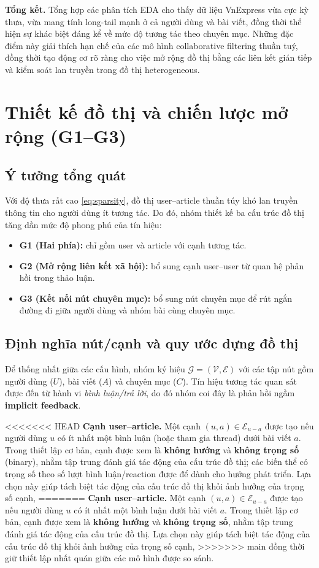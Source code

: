 \documentclass[11pt]{article}
\begin{document}
\textbf{Tổng kết.}
Tổng hợp các phân tích EDA cho thấy dữ liệu VnExpress vừa cực kỳ thưa,
vừa mang tính long-tail mạnh ở cả người dùng và bài viết,
đồng thời thể hiện sự khác biệt đáng kể về mức độ tương tác theo chuyên mục.
Những đặc điểm này giải thích hạn chế của các mô hình collaborative filtering thuần tuý,
đồng thời tạo động cơ rõ ràng cho việc mở rộng đồ thị bằng các liên kết gián tiếp
và kiểm soát lan truyền trong đồ thị heterogeneous.

\section{Thiết kế đồ thị và chiến lược mở rộng (G1--G3)}
\label{sec:graph}

\subsection{Ý tưởng tổng quát}
Với độ thưa rất cao \eqref{eq:sparsity}, đồ thị user--article thuần túy khó lan truyền thông tin cho người dùng ít tương tác. Do đó, nhóm thiết kế ba cấu trúc đồ thị tăng dần mức độ phong phú của tín hiệu:
\begin{itemize}
    \item \textbf{G1 (Hai phía):} chỉ gồm user và article với cạnh tương tác.
    \item \textbf{G2 (Mở rộng liên kết xã hội):} bổ sung cạnh user--user từ quan hệ phản hồi trong thảo luận.
    \item \textbf{G3 (Kết nối nút chuyên mục):} bổ sung nút chuyên mục để rút ngắn đường đi giữa người dùng và nhóm bài cùng chuyên mục.
\end{itemize}

\subsection{Định nghĩa nút/cạnh và quy ước dựng đồ thị}
Để thống nhất giữa các cấu hình, nhóm ký hiệu $\mathcal{G}=(\mathcal{V},\mathcal{E})$ với các tập nút gồm người dùng ($U$), bài viết ($A$) và chuyên mục ($C$). Tín hiệu tương tác quan sát được đến từ hành vi \textit{bình luận/trả lời}, do đó nhóm coi đây là phản hồi ngầm \textbf{implicit feedback}.

<<<<<<< HEAD
\textbf{Cạnh user--article.} Một cạnh $(u,a)\in \mathcal{E}_{u-a}$ được tạo nếu người dùng $u$ có ít nhất một bình luận (hoặc tham gia thread) dưới bài viết $a$. Trong thiết lập cơ bản, cạnh được xem là \textbf{không hướng} và \textbf{không trọng số} (binary), nhằm tập trung đánh giá tác động của cấu trúc đồ thị; các biến thể có trọng số theo số lượt bình luận/reaction được để dành cho hướng phát triển. Lựa chọn này giúp tách biệt tác động của cấu trúc đồ thị khỏi ảnh hưởng của trọng số cạnh,
=======
\textbf{Cạnh user--article.} Một cạnh $(u,a)\in \mathcal{E}_{u-a}$ được tạo nếu người dùng $u$ có ít nhất một bình luận dưới bài viết $a$. Trong thiết lập cơ bản, cạnh được xem là \textbf{không hướng} và \textbf{không trọng số}, nhằm tập trung đánh giá tác động của cấu trúc đồ thị. Lựa chọn này giúp tách biệt tác động của cấu trúc đồ thị khỏi ảnh hưởng của trọng số cạnh,
>>>>>>> main
đồng thời giữ thiết lập nhất quán giữa các mô hình được so sánh.
\end{document}
